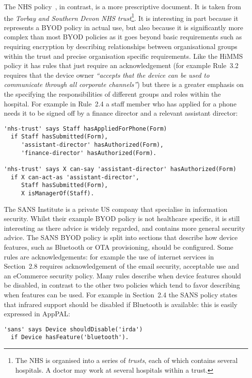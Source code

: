 \documentclass[a4paper]{article}
\begin{document}
The NHS policy~\cite{kennington_mobiles_2014}, in contrast, is a more prescriptive document.
It is taken from the \emph{Torbay and Southern Devon NHS trust}\footnote{The NHS is organised into a series of \emph{trusts}, each of which contains several hospitals.  A doctor may work at several hospitals within a trust.}. 
It is interesting in part because it represents a \ac{BYOD} policy in actual use, but also because it is significantly more complex than most \ac{BYOD} policies as it goes beyond basic requirements such as requiring encryption by describing relationships between organisational groups within the trust and precise organisation specific requirements.
Like the \ac{HiMMS} policy it has rules that just require an acknowledgement (for example Rule~3.2 requires that the device owner \emph{``accepts that the device can be used to communicate through all corporate channels''}) but there is a greater emphasis on the specifying the responsibilities of different groups and roles within the hospital.  For example in Rule~2.4 a staff member who has applied for a phone needs it to be signed off by a finance director and a relevant assistant director:
\begin{lstlisting}[title={\footnotesize\textbf{NHS}:~\itshape 
Upon receipt of the completed application form, allocation will also need to be authorised by the relevant Assistant Director and the Director of Finance.}]
'nhs-trust' says Staff hasAppliedForPhone(Form)
  if Staff hasSubmitted(Form),
     'assistant-director' hasAuthorized(Form),
     'finance-director' hasAuthorized(Form).

'nhs-trust' says X can-say 'assistant-director' hasAuthorized(Form)
  if X can-act-as 'assistant-director',
     Staff hasSubmitted(Form),
     X isManagerOf(Staff).
\end{lstlisting}

The SANS Institute is a private US company that specialise in information security.
Whilst their example \ac{BYOD} policy is not healthcare specific, it is still interesting as there advice is widely regarded, and contains more general security advice.
The SANS \ac{BYOD} policy is split into sections that describe how device features, such as Bluetooth or OTA provisioning, should be configured.  Some rules are acknowledgements: for example the use of internet services in Section~2.8 requires acknowledgement of the email security, acceptable use and an eCommerce security policy.
Many rules describe when device features should be disabled, in contrast to the other two policies which tend to favor describing when features can be used.
For example in Section~2.4 the SANS policy states that infrared support should be disabled if Bluetooth is available: this is easily expressed in AppPAL:
\begin{lstlisting}[title={\footnotesize\textbf{SANS}:~\itshape 
Infrared supported MUST be disabled if Bluetooth connectivity is supported.}]
'sans' says Device shouldDisable('irda')
  if Device hasFeature('bluetooth').
\end{lstlisting}
\end{document}
